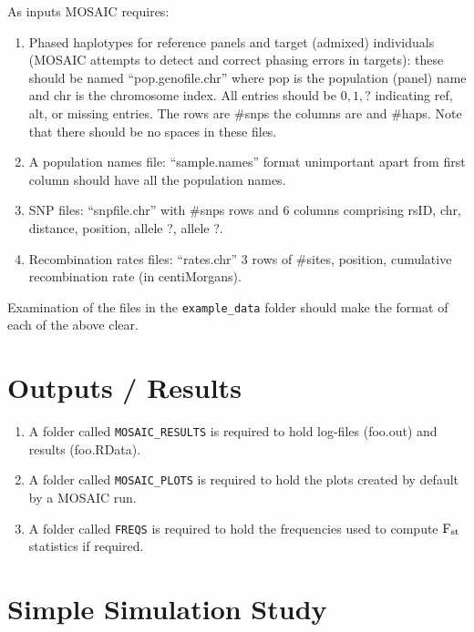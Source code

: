 \documentclass{article}
\begin{document}
As inputs MOSAIC requires:
\begin{enumerate}
  \item Phased haplotypes for reference panels and target (admixed) individuals (MOSAIC attempts to detect and correct phasing errors in targets): 
    these should be named ``pop.genofile.chr'' where pop is the population (panel) name and chr is the chromosome index.  
    All entries should be $0,1,?$ indicating ref, alt, or missing entries. The rows are \#snps the columns are and \#haps. Note that there should be no spaces 
    in these files. 
  \item A population names file: ``sample.names'' format unimportant apart from first column should have all the population names.
  \item SNP files: ``snpfile.chr'' with \#snps rows and 6 columns comprising rsID, chr, distance, position, allele ?, allele ?. 
  \item Recombination rates files: ``rates.chr'' 3 rows of \#sites, position, cumulative recombination rate (in centiMorgans). 
\end{enumerate}
Examination of the files in the \texttt{example\_data} folder should make the format of each of the above clear. 

\section{Outputs / Results}
\begin{enumerate}
  \item A folder called \texttt{MOSAIC\_RESULTS} is required to hold log-files (foo.out) and results (foo.RData).  
  \item A folder called \texttt{MOSAIC\_PLOTS} is required to hold the plots created by default by a MOSAIC run.
  \item A folder called \texttt{FREQS} is required to hold the frequencies used to compute $\textrm{F}_{\textrm{st}}$ statistics if required.
\end{enumerate}

\section{Simple Simulation Study}


\end{document}
